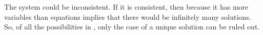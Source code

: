 The system could be inconsistent.  If it is consistent, then because it has more variables than equations  implies that there would be infinitely many solutions.  So, of all the possibilities in , only the case of a unique solution can be ruled out.
